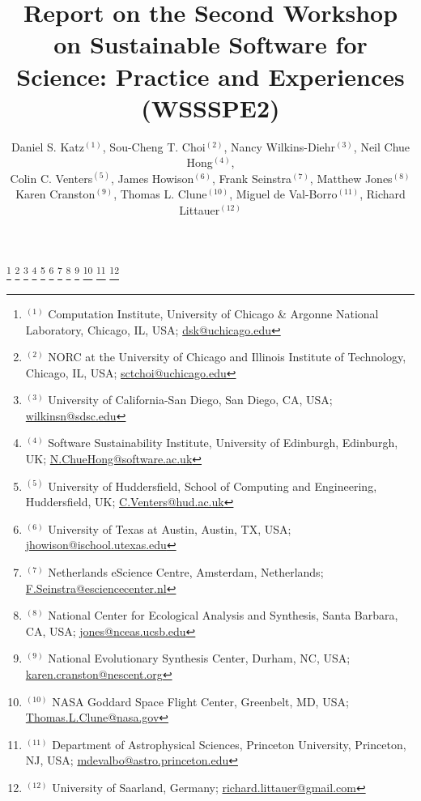 \documentclass[11pt, oneside]{amsart}
\begin{document}
\title[]{Report on the Second Workshop on Sustainable Software for Science: Practice and Experiences (WSSSPE2)}

\author{Daniel S. Katz$^{(1)}$, Sou-Cheng T. Choi$^{(2)}$, Nancy Wilkins-Diehr$^{(3)}$, Neil Chue Hong$^{(4)}$,
\\Colin C. Venters$^{(5)}$, James Howison$^{(6)}$, Frank Seinstra$^{(7)}$, Matthew Jones$^{(8)}$
\\Karen Cranston$^{(9)}$, Thomas L. Clune$^{(10)}$, Miguel de Val-Borro$^{(11)}$, Richard Littauer$^{(12)}$}
%
\thanks{{}$^{(1)}$ Computation Institute, 
University of Chicago \& Argonne National Laboratory, Chicago, IL, USA; \url{dsk@uchicago.edu}}
%
\thanks{{}$^{(2)}$ NORC at the University of Chicago and Illinois Institute of Technology, Chicago, IL, USA; \url{sctchoi@uchicago.edu}}
%
\thanks{{}$^{(3)}$ University of California-San Diego, San Diego, CA, USA; \url{wilkinsn@sdsc.edu}}
%
\thanks{{}$^{(4)}$ Software Sustainability Institute, 
University of Edinburgh, Edinburgh, UK; \url{N.ChueHong@software.ac.uk}}
%
\thanks{{}$^{(5)}$ University of Huddersfield, School of Computing and Engineering, Huddersfield, UK; \url{C.Venters@hud.ac.uk}}
%
\thanks{{}$^{(6)}$ University of Texas at Austin, Austin, TX, USA; \url{jhowison@ischool.utexas.edu}}
%
\thanks{{}$^{(7)}$ Netherlands eScience Centre, Amsterdam, Netherlands; \url{F.Seinstra@esciencecenter.nl}}
%
\thanks{{}$^{(8)}$ National Center for Ecological Analysis and Synthesis, Santa Barbara, CA, USA; \url{jones@nceas.ucsb.edu}}
%
\thanks{{}$^{(9)}$ National Evolutionary Synthesis Center, Durham, NC, USA; \url{karen.cranston@nescent.org}}
%
\thanks{{}$^{(10)}$ NASA Goddard Space Flight Center, Greenbelt, MD, USA; \url{Thomas.L.Clune@nasa.gov}}
%
\thanks{{}$^{(11)}$ Department of Astrophysical Sciences, 
Princeton University, Princeton, NJ, USA; \url{mdevalbo@astro.princeton.edu}}
%
\thanks{{}$^{(12)}$ University of Saarland, Germany; \url{richard.littauer@gmail.com}}
%
 
\end{document}

